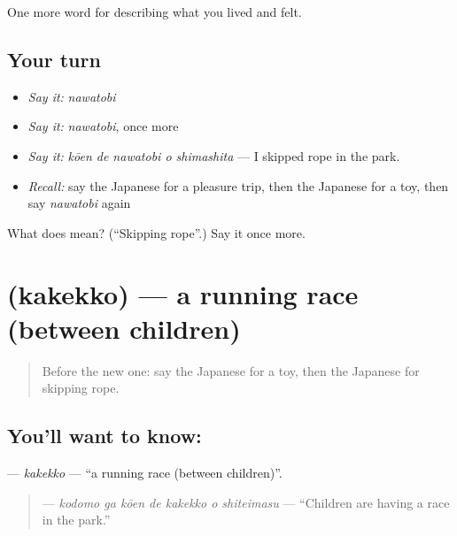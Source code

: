 \begin{grammarlens}[title={What you've built}]
One more word for describing what you lived and felt.
\end{grammarlens}

\subsection*{Your turn}
\begin{itemize}
\raggedright
  \item \emph{Say it:} \emph{nawatobi}
  \item \emph{Say it:} \emph{nawatobi}, once more
  \item \emph{Say it:} \emph{kōen de nawatobi o shimashita} — I skipped rope in the park.
  \item \emph{Recall:} say the Japanese for a pleasure trip, then the Japanese for a toy, then say \emph{nawatobi} again
\end{itemize}

\begin{tcolorbox}[breakable,colback=teal!4,colframe=teal!35!black,title={Before you move on}]
What does  mean? (\textquotedblleft{}Skipping rope\textquotedblright{}.) Say it once more.
\end{tcolorbox}
\section[\texorpdfstring{\ja{かけっこ} (kakekko)}{かけっこ (kakekko)}]{ (kakekko) — a running race (between children)}

\label{lesson:JA-C500-kakekko}



\begin{quote}
Before the new one: say the Japanese for a toy, then the Japanese for skipping rope.
\end{quote}

\subsection*{You'll want to know: }
\textbf{} — \emph{kakekko} — \textquotedblleft{}a running race (between children)\textquotedblright{}.

\begin{quote}
\textbf{   } — \emph{kodomo ga kōen de kakekko o shiteimasu} — \textquotedblleft{}Children are having a race in the park.\textquotedblright{}
\end{quote}

